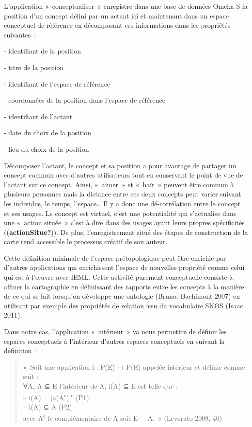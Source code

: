 \documentclass[
  letterpaper,
  DIV=11,
  numbers=noendperiod]{scrreprt}
\begin{document}
L'application «~conceptualiser~» enregistre dans une base de données
Omeka S la position d'un concept défini par un actant ici et maintenant
dans un espace conceptuel de référence en décomposant ces informations
dans les propriétés suivantes~:

- identifiant de la position

- titre de la position

- identifiant de l'espace de référence

- coordonnées de la position dans l'espace de référence

- identifiant de l'actant

- date du choix de la position

- lieu du choix de la position

Décomposer l'actant, le concept et sa position a pour avantage de
partager un concept commun avec d'autres utilisateurs tout en conservant
le point de vue de l'actant sur ce concept. Ainsi, «~aimer~» et «~haïr~»
peuvent être commun à plusieurs personnes mais la distance entre ces
deux concepts peut varier suivant les individus, le temps,
l'espace\ldots{} Il y a donc une dé-corrélation entre le concept et ses
usages. Le concept est virtuel, c'est une potentialité qui s'actualise
dans une «~action située~» c'est à dire dans des usages ayant leurs
propres spécificités ((\textbf{actionSitue?})). De plus,
l'enregistrement situé des étapes de construction de la carte rend
accessible le processus créatif de son auteur.

Cette définition minimale de l'espace prétopologique peut être enrichie
par d'autres applications qui enrichissent l'espace de nouvelles
propriété comme celui qui est à l'œuvre avec IEML. Cette activité
purement conceptuelle consiste à affiner la cartographie en définissant
des rapports entre les concepts à la manière de ce qui se fait lorsqu'on
développe une ontologie (Bruno. Bachimont 2007) en utilisant par exemple
des propriétés de relation issu du vocabulaire SKOS (Isaac 2011).

Dans notre cas, l'application «~intérieur~» va nous permettre de définir
les espaces conceptuels à l'intérieur d'autres espaces conceptuels en
suivant la définition~:

\begin{quote}
«~Soit une application i : P(E) → P(E) appelée intérieur et définie
comme suit :\\
∀A, A ⊆ E l'intérieur de A, i(A) ⊆ E est telle que :\\
-- i(A) = {[}a(A\textsuperscript{c}){]}\textsuperscript{c} (P1)\\
-- i(A) ⊆ A (P2)\\
avec A\textsuperscript{c} le complémentaire de A soit E − A.~» (Levorato
2008, 40)
\end{quote}
\end{document}
